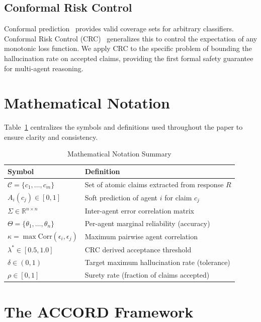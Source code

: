 \documentclass[conference]{IEEEtran}
\begin{document}
\subsection{Conformal Risk Control}
Conformal prediction~\cite{b5} provides valid coverage sets for arbitrary classifiers. Conformal Risk Control (CRC)~\cite{b1} generalizes this to control the expectation of any monotonic loss function. We apply CRC to the specific problem of bounding the hallucination rate on accepted claims, providing the first formal safety guarantee for multi-agent reasoning.

\section{Mathematical Notation}
Table~\ref{tab:notation} centralizes the symbols and definitions used throughout the paper to ensure clarity and consistency.

\begin{table}[htbp]
\caption{Mathematical Notation Summary}
\label{tab:notation}
\centering
\begin{tabular}{ll}
\toprule
Symbol & Definition \\
\midrule
$\mathcal{C} = \{c_1, \dots, c_m\}$ & Set of atomic claims extracted from response $R$ \\
$A_i(c_j) \in [0, 1]$ & Soft prediction of agent $i$ for claim $c_j$ \\
$\Sigma \in \mathbb{R}^{n \times n}$ & Inter-agent error correlation matrix \\
$\Theta = \{\theta_1, \dots, \theta_n\}$ & Per-agent marginal reliability (accuracy) \\
$\kappa = \max \text{Corr}(\epsilon_i, \epsilon_j)$ & Maximum pairwise agent correlation \\
$\lambda^* \in [0.5, 1.0]$ & CRC derived acceptance threshold \\
$\delta \in (0, 1)$ & Target maximum hallucination rate (tolerance) \\
$\rho \in [0, 1]$ & Surety rate (fraction of claims accepted) \\
\bottomrule
\end{tabular}
\end{table}

\section{The ACCORD Framework}
\end{document}
